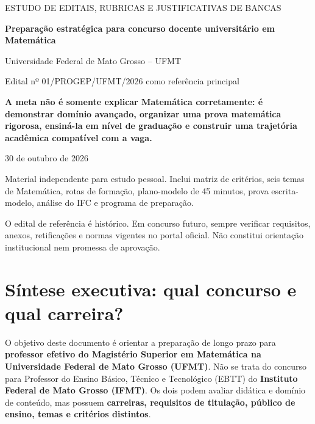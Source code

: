 \documentclass[11pt,a4paper]{article}
\begin{document}
\begin{titlepage}
\centering
\vspace*{1.6cm}
{\large ESTUDO DE EDITAIS, RUBRICAS E JUSTIFICATIVAS DE BANCAS\par}
\vspace{1.1cm}
{\Huge\bfseries\color{marinho} Preparação estratégica para concurso docente universitário em Matemática\par}
\vspace{.7cm}
{\LARGE Universidade Federal de Mato Grosso -- UFMT\par}
\vspace{.4cm}
{\large Edital nº 01/PROGEP/UFMT/2026 como referência principal\par}
\vspace{1.3cm}
\begin{ideia}
\centering\large
\textbf{A meta não é somente explicar Matemática corretamente: é demonstrar domínio avançado, organizar uma prova matemática rigorosa, ensiná-la em nível de graduação e construir uma trajetória acadêmica compatível com a vaga.}
\end{ideia}
\vfill
{\large 30 de outubro de 2026\par}
{\small Material independente para estudo pessoal. Inclui matriz de critérios, seis temas de Matemática, rotas de formação, plano-modelo de 45 minutos, prova escrita-modelo, análise do IFC e programa de preparação.\par}
\vspace{.5cm}
{\footnotesize O edital de referência é histórico. Em concurso futuro, sempre verificar requisitos, anexos, retificações e normas vigentes no portal oficial. Não constitui orientação institucional nem promessa de aprovação.\par}
\end{titlepage}
\tableofcontents
\newpage

\section{Síntese executiva: qual concurso e qual carreira?}
O objetivo deste documento é orientar a preparação de longo prazo para \textbf{professor efetivo do Magistério Superior em Matemática na Universidade Federal de Mato Grosso (UFMT)}. Não se trata do concurso para Professor do Ensino Básico, Técnico e Tecnológico (EBTT) do \textbf{Instituto Federal de Mato Grosso (IFMT)}. Os dois podem avaliar didática e domínio de conteúdo, mas possuem \textbf{carreiras, requisitos de titulação, público de ensino, temas e critérios distintos}.
\end{document}
